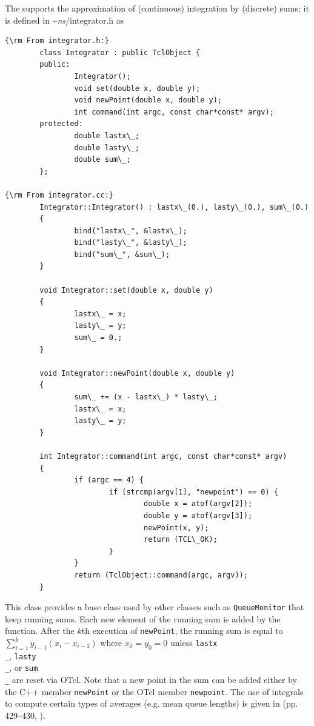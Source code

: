The  
supports the approximation of (continuous) integration by (discrete)
sums; it is defined in \textasciitilde\emph{ns}/{integrator.h} as
\begin{verbatim}
{\rm From integrator.h:}
        class Integrator : public TclObject {
        public:
                Integrator();
                void set(double x, double y);
                void newPoint(double x, double y);
                int command(int argc, const char*const* argv);
        protected:
                double lastx\_;
                double lasty\_;
                double sum\_;
        };

{\rm From integrator.cc:}
        Integrator::Integrator() : lastx\_(0.), lasty\_(0.), sum\_(0.)
        {
                bind("lastx\_", &lastx\_);
                bind("lasty\_", &lasty\_);
                bind("sum\_", &sum\_);
        }

        void Integrator::set(double x, double y)
        {
                lastx\_ = x;
                lasty\_ = y;
                sum\_ = 0.;
        }

        void Integrator::newPoint(double x, double y)
        {
                sum\_ += (x - lastx\_) * lasty\_;
                lastx\_ = x;
                lasty\_ = y;
        }

        int Integrator::command(int argc, const char*const* argv)
        {
                if (argc == 4) {
                        if (strcmp(argv[1], "newpoint") == 0) {
                                double x = atof(argv[2]);
                                double y = atof(argv[3]);
                                newPoint(x, y);
                                return (TCL\_OK);
                        }
                }
                return (TclObject::command(argc, argv));
        }
\end{verbatim}
This class provides a base class used by other classes such
as {\tt QueueMonitor} that keep running sums.
Each new element of the running sum is added by
the  function.
After the $k$th execution of {\tt newPoint}, the running sum
is equal to $\sum_{i=1}^{k}y_{i-1}(x_i - x_{i-1})$ where
$x_0 = y_0 = 0$ unless {\tt lastx\\_}, {\tt lasty\\_}, or {\tt sum\\_}
are reset via OTcl.
Note that a new point in the sum can be added either by the
C++ member {\tt newPoint} or the OTcl member {\tt newpoint}.
The use of integrals to compute certain types of averages
(e.g. mean queue lengths) is given in (pp. 429--430, \cite{Jain91:Art}).

